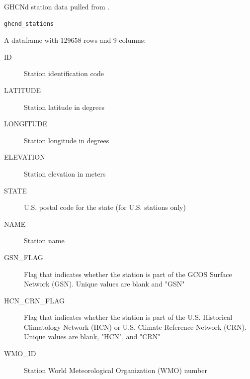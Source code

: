 %
\begin{Description}
GHCNd station data pulled from
.
\end{Description}
%
\begin{Usage}
\begin{verbatim}
ghcnd_stations
\end{verbatim}
\end{Usage}
%
\begin{Format}
%
\begin{SubSection}{}

A dataframe with 129658 rows and 9 columns:
\begin{description}

\item[ID] Station identification code
\item[LATITUDE] Station latitude in degrees
\item[LONGITUDE] Station longitude in degrees
\item[ELEVATION] Station elevation in meters
\item[STATE] U.S. postal code for the state (for U.S. stations only)
\item[NAME] Station name
\item[GSN\_FLAG] Flag that indicates whether the station is part of
the GCOS Surface Network (GSN). Unique values are blank and "GSN"
\item[HCN\_CRN\_FLAG] Flag that indicates whether the station is part of the
U.S. Historical Climatology Network (HCN) or U.S. Climate Reference
Network (CRN). Unique values are blank, "HCN", and "CRN"
\item[WMO\_ID] Station World Meteorological Organization (WMO) number

\end{description}

\end{SubSection}

\end{Format}
